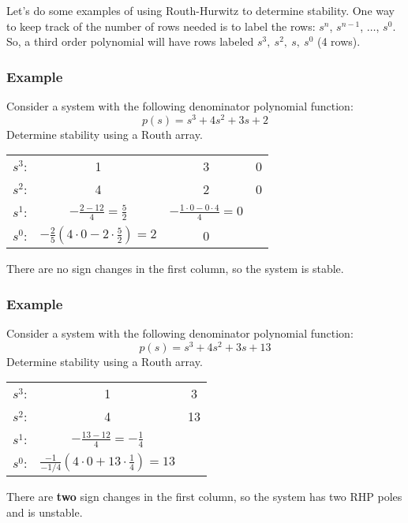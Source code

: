 \documentclass{book}
\newcommand{\exmp}{\subsubsection*{Example}}
\begin{document}
Let's do some examples of using Routh-Hurwitz to determine stability. One way to keep track of the number of rows needed is to label the rows: $ s^n $, $ s^{n-1} $, $ \ldots $, $ s^0 $. So, a third order polynomial will have rows labeled $ s^3,\ s^2,\ s,\ s^0 $ (4 rows).
\exmp
Consider a system with the following denominator polynomial function:
\[ p(s) = s^3 + 4s^2 + 3s + 2 \]
Determine stability using a Routh array.
\begin{center}
	\begin{tabular}{c c c c} \vspace{1em}
		$ s^3 $: & 1 & 3 & 0 \\ \vspace{1em}
		$ s^2 $: & 4 & 2 & 0 \\ \vspace{1em}
		$ s^1 $: & $ -\frac{2-12}{4} = \frac{5}{2} $ & $ -\frac{1\cdot0-0\cdot4}{4}=0 $ &  \\ \vspace{1em}
		$ s^0 $: & $ -\frac{2}{5} \left(4\cdot0 - 2\cdot \frac{5}{2}\right) = 2 $ & 0 & \\
	\end{tabular}
\end{center}
There are no sign changes in the first column, so the system is stable.

\exmp
Consider a system with the following denominator polynomial function:
\[ p(s) = s^3 + 4s^2 + 3s + 13 \]
Determine stability using a Routh array.
\begin{center}
	\begin{tabular}{c c c} \vspace{1em}
		$ s^3 $: & 	1 & 3 \\ \vspace{1em}
		$ s^2 $: & 	4 & 13 \\ \vspace{1em}
		$ s^1 $: & 	$ - \frac{13-12}{4} = -\frac{1}{4} $ & \\ \vspace{1em}
		$ s^0 $: & 	$ \frac{-1}{-1/4} \left(4\cdot0 + 13\cdot \frac{1}{4}\right) = 13 $ & \\
	\end{tabular}
\end{center}

There are \textbf{two} sign changes in the first column, so the system has two RHP poles and is unstable.
\end{document}
